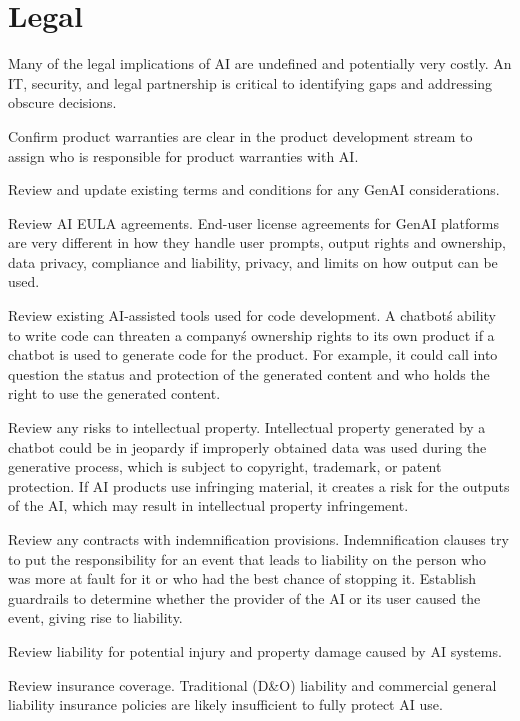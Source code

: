 \section{Legal}
Many of the legal implications of AI are undefined and potentially very costly.
An IT, security, and legal partnership is critical to identifying gaps and
addressing obscure decisions.
\begin{minipage}{\linewidth}
\begin{checklist}
  \item Confirm product warranties are clear in the product development stream to assign who is responsible for product warranties with AI.
  \item Review and update existing terms and conditions for any GenAI considerations.
  \item Review AI EULA agreements. End-user license agreements for GenAI platforms are very different in how they handle user prompts, output rights and ownership, data privacy, compliance and liability, privacy, and limits on how output can be used.
  \item Review existing AI-assisted tools used for code development. A chatbot\'s ability to write code can threaten a company\'s ownership rights to its own product if a chatbot is used to generate code for the product. For example, it could call into question the status and protection of the generated content and who holds the right to use the generated content.
  \item Review any risks to intellectual property. Intellectual property generated by a chatbot could be in jeopardy if improperly obtained data was used during the generative process, which is subject to copyright, trademark, or patent protection. If AI products use infringing material, it creates a risk for the outputs of the AI, which may result in intellectual property infringement.
  \item Review any contracts with indemnification provisions. Indemnification clauses try to put the responsibility for an event that leads to liability on the person who was more at fault for it or who had the best chance of stopping it. Establish guardrails to determine whether the provider of the AI or its user caused the event, giving rise to liability.
  \item Review liability for potential injury and property damage caused by AI systems.
  \item Review insurance coverage. Traditional (D\&O) liability and commercial general liability insurance policies are likely insufficient to fully protect AI use.

\end{checklist}
\end{minipage}
